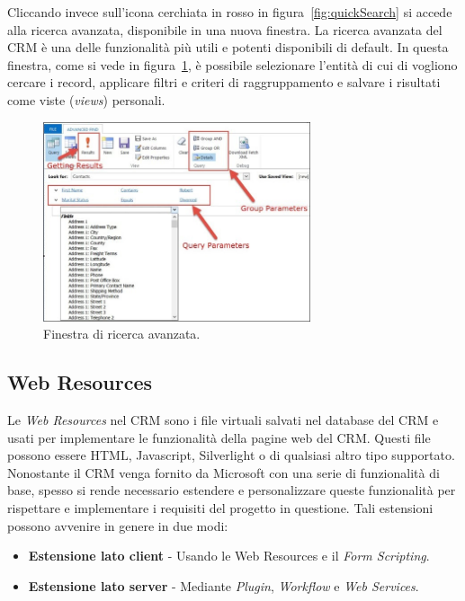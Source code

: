 Cliccando invece sull'icona cerchiata in rosso in figura~\ref{fig:quickSearch} si accede alla ricerca avanzata, disponibile in una nuova finestra. La ricerca avanzata del CRM è una delle funzionalità più utili e potenti disponibili di default. In questa finestra, come si vede in figura~\ref{fig:advancedSearch}, è possibile selezionare l'entità di cui di vogliono cercare i record, applicare filtri e criteri di raggruppamento e salvare i risultati come viste (\textit{views}) personali.
\begin{figure}[ht]
  \centering
  \includegraphics[width=0.7\textwidth]{advanced-search.png}
  \caption{Finestra di ricerca avanzata.}
  \label{fig:advancedSearch}
\end{figure}

\subsection{Web Resources}
 Le \textit{Web Resources} nel CRM sono i file virtuali salvati nel database del CRM e usati per implementare le funzionalità della pagine web del CRM. Questi file possono essere HTML, Javascript, Silverlight o di qualsiasi altro tipo supportato. 
 Nonostante il CRM venga fornito da Microsoft con una serie di funzionalità di base, spesso si rende necessario estendere e personalizzare queste funzionalità per rispettare e implementare i requisiti del progetto in questione. Tali estensioni possono avvenire in genere in due modi:
 \begin{itemize}
   \item \textbf{Estensione lato client} - Usando le Web Resources e il \textit{Form Scripting}.
   \item \textbf{Estensione lato server} - Mediante \textit{Plugin}, \textit{Workflow} e \textit{Web Services}.
 \end{itemize}


